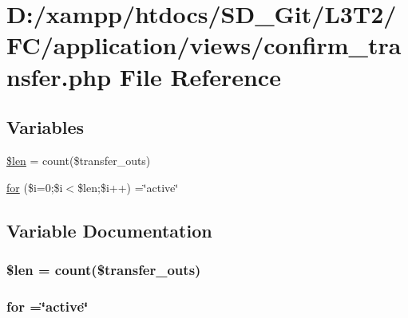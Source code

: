 \hypertarget{confirm__transfer_8php}{}\section{D\+:/xampp/htdocs/\+S\+D\+\_\+\+Git/\+L3\+T2/\+F\+C/application/views/confirm\+\_\+transfer.php File Reference}
\label{confirm__transfer_8php}
\subsection*{Variables}
\begin{DoxyCompactItemize}
\item 
\hyperlink{confirm__transfer_8php_aa28657aaa5fcc7509dd883662f8accbe}{\$len} = count(\$transfer\+\_\+outs)
\item 
\hyperlink{confirm__transfer_8php_aaf007b9fa5c90d7c5a7011bece9cfc15}{for} (\$i=0;\$i$<$\$len;\$i++) =\char`\"{}active\char`\"{}
\end{DoxyCompactItemize}


\subsection{Variable Documentation}
\hypertarget{confirm__transfer_8php_aa28657aaa5fcc7509dd883662f8accbe}{}
\subsubsection[{\$len}]{\setlength{\rightskip}{0pt plus 5cm}\$len = count(\$transfer\+\_\+outs)}\label{confirm__transfer_8php_aa28657aaa5fcc7509dd883662f8accbe}
\hypertarget{confirm__transfer_8php_aaf007b9fa5c90d7c5a7011bece9cfc15}{}
\subsubsection[{for}]{\setlength{\rightskip}{0pt plus 5cm}for =\char`\"{}active\char`\"{}}\label{confirm__transfer_8php_aaf007b9fa5c90d7c5a7011bece9cfc15}

